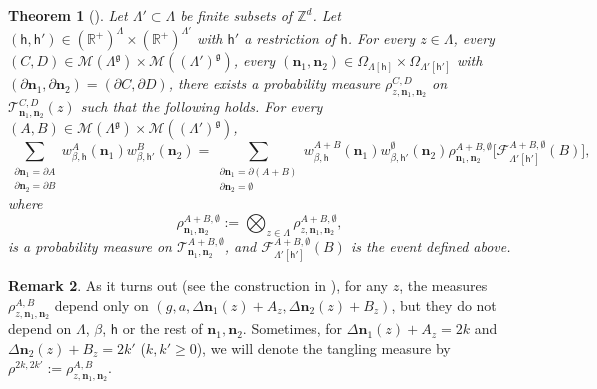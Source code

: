 \documentclass[11pt,a4paper]{article}
\newtheorem{theorem}{Theorem}[section]
\theoremstyle{definition}
\newtheorem{remark}[theorem]{Remark}
\numberwithin{equation}{section}
\newcommand\n{\mathbf{n}}
\newcommand\fg{\mathfrak{g}}
\newcommand\sn{\partial\mathbf{n}}
\begin{document}
 
\begin{theorem}[]\label{thm: switching lemma rtc}
Let $\Lambda'\subset\Lambda$ be finite subsets of $\mathbb Z^d$. Let $(\mathsf{h},\mathsf{h}')\in (\mathbb R^+)^\Lambda\times (\mathbb R^+)^{\Lambda'}$ with $\mathsf{h}'$ a restriction of $\mathsf{h}$. For every $z\in \Lambda$, every $(C,D)\in \mathcal M(\Lambda^\fg)\times  \mathcal M((\Lambda')^\fg)$, every $(\n_1,\n_2)\in \Omega_{\Lambda[\mathsf{h}]}\times \Omega_{\Lambda'[\mathsf{h}']}$ with $(\sn_1,\sn_2)=(\partial C,\partial D)$, there exists a probability measure $\rho_{z,\n_1,\n_2}^{C,D}$ on $\mathcal{T}_{\n_1,\n_2}^{C,D}(z)$ such that the following holds. For every $(A,B)\in \mathcal{M}(\Lambda^\fg)\times \mathcal M((\Lambda')^\fg)$, 
\begin{equation}
\sum_{\substack{\partial \n_1 = \partial A \\ \partial \n_2 = \partial B}} 
w^A_{\beta,\mathsf{h}}(\n_1) w^B_{\beta,\mathsf{h}'}(\n_2) =\sum_{\substack{\partial \n_1 = \partial(A+B) \\ \partial \n_2 = \emptyset}} 
w^{A+B}_{\beta,\mathsf{h}}(\n_1)w^{\emptyset}_{\beta,\mathsf{h}'}(\n_2)  \rho^{A+B,\emptyset}_{\n_1,\n_2} \big[ \mathcal{F}_{\Lambda'[\mathsf{h}']}^{A+B,\emptyset}(B) \big],
\end{equation}
where 
\begin{equation}
\rho_{\n_1,\n_2}^{A+B,\emptyset}:=\bigotimes_{z \in \Lambda} \rho_{z,\n_1, \n_2}^{A+B,\emptyset},
\end{equation}
is a probability measure on $\mathcal{T}_{\n_1,\n_2}^{A+B,\emptyset}$, and $\mathcal{F}_{\Lambda'[\mathsf{h}']}^{A+B,\emptyset}(B)$ is the event defined above.
\end{theorem}
\begin{remark}\label{rem:dependencyoftanglingmeasures}
As it turns out (see the construction in \textup{\cite{GunaratnamPanagiotisPanisSeveroPhi42022}}), for any $z$, the measures $\rho^{A,B}_{z,\n_1,\n_2}$ depend only on 
$(g,a,\Delta \n_1(z)+A_z,\Delta\n_2(z)+B_z)$, but they do not depend on $\Lambda$, $\beta$, $\mathsf{h}$ or the rest of $\n_1,\n_2$.
Sometimes, for $\Delta{\n}_1(z)+A_z=2k$ and $\Delta{\n}_2(z)+B_z=2k'$ ($k,k'\geq 0$), we will denote the tangling measure by $\rho^{2k,2k'}:=\rho^{A,B}_{z,\n_1,\n_2}$.
\end{remark}
\end{document}
